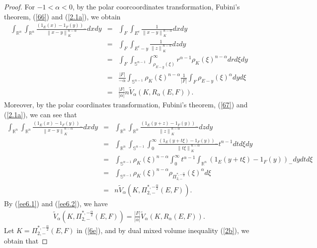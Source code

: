\documentclass[preprint,12pt]{elsarticle}
\begin{document}
\begin{proof}
For $-1<\alpha<0$, by the polar coorcoordinates transformation, Fubini’s theorem, (\ref{66}) and (\ref{2.1a}), we obtain
\begin{eqnarray}\label{ee6.1}
\int_{\mathbb{R}^n}\int_{\mathbb{R}^n}\frac{{(1_{E}(x)-1_{F}(y))}_{- }}{{\left \| x-y\right \|}_{K }^{n-\alpha}}dxdy&=&\int_{F}\int_{E^{c}}\frac{1}{{\left \| x-y\right \|}_{K }^{n-\alpha}}dxdy\nonumber\\
&=& \int_{F}\int_{E^{c}-y}\frac{1}{{{\left \| z\right \|}_{K }^{n-\alpha}}}dzdy\nonumber\\
&=&\int_{F}\int_{\mathbb{S}^{n-1}}\int_{{{\rho}_{E-y} (\xi)}}^{\infty }{r}^{\alpha-1}{{\rho}_{K} (\xi)}^{n-\alpha }drd\xi dy \nonumber\\
&=&\frac{|F|}{-\alpha }\int_{\mathbb{S}^{n-1}}{{\rho}_{K} (\xi)}^{n-\alpha }\frac{1}{|F|}\int_{F}{{\rho}_{E-y} (\xi)}^{\alpha }dyd\xi\nonumber\\
&=&\frac{|F|}{|\alpha |}n\widetilde{V}_{\alpha} (K,{R}_{\alpha }(E,F)).
\end{eqnarray} 
Moreover, by the polar coordinates transformation, Fubini’s theorem, (\ref{67}) and (\ref{2.1a}), we can see that
\begin{eqnarray}\label{ee6.2}
\int_{\mathbb{R}^n}\int_{\mathbb{R}^n}\frac{{(1_{E}(x)-1_{F}(y))}_{- }}{{\left \| x-y\right \|}_{K }^{n-\alpha}}dxdy&=&\int_{\mathbb{R}^n}\int_{\mathbb{R}^n}\frac{{(1_{E}(y+z)-1_{F}(y))}_{- }}{{\left \| z\right \|}_{K }^{n-\alpha}}dzdy\nonumber\\
&=&\int_{\mathbb{R}^n}\int_{\mathbb{S}^{n-1}}\int_{0}^{\infty }\frac{{(1_{E}(y+t\xi)-1_{F}(y))}_{- }}{{\left \|t\xi\right \|}_{K }^{n-\alpha}}{t}^{n-1}dtd\xi dy\nonumber\\
&=&\int_{\mathbb{S}^{n-1}}{{\rho}_{K} (\xi)}^{n-\alpha}\int_{0}^{\infty }{t}^{\alpha-1}\int_{\mathbb{R}^n}{(1_{E}(y+t\xi)-1_{F}(y))}_{-}dydtd\xi\nonumber\\
&=&\int_{\mathbb{S}^{n-1}}{{\rho}_{K} (\xi)}^{n-\alpha}{{\rho}_{{\Pi}_{2,-}^{*,-\frac{\alpha }{2} }} (\xi)}^{\alpha}d\xi\nonumber\\
&=&n\widetilde{V}_{\alpha}(K,{\Pi }_{2,-}^{*,-\frac{\alpha }{2} }(E,F)).
\end{eqnarray} 
By (\ref{ee6.1}) and (\ref{ee6.2}), we have
\begin{eqnarray}\label{6e}
\widetilde{V}_{\alpha}(K,{\Pi }_{2,-}^{*,-\frac{\alpha }{2} }(E,F))=\frac{|F|}{|\alpha |}\widetilde{V}_{\alpha} (K,{R}_{\alpha }(E,F)).
\end{eqnarray} 
Let $K={\Pi }_{2,-}^{*,-\frac{\alpha }{2} }(E,F)$ in (\ref{6e}), and by dual mixed volume inequality (\ref{2b}), we obtain that

\end{proof}
\end{document}
